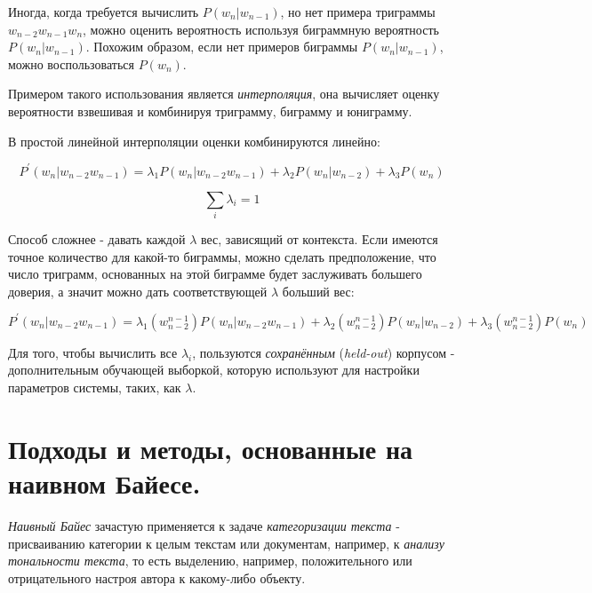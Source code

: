 \documentclass[a4paper,12pt,preview]{report} %
\begin{document}
	 Иногда, когда требуется вычислить $P(w_n | w_{n-1})$, но нет примера триграммы $w_{n-2}w_{n-1}w_{n}$, можно оценить вероятность используя биграммную вероятность $P(w_{n} | w_{n-1})$. Похожим образом, если нет примеров биграммы $P(w_n | w_{n-1})$, можно воспользоваться $P(w_n)$.
	 
	 Примером такого использования является \textit{интерполяция}, она вычисляет оценку вероятности взвешивая и комбинируя триграмму, биграмму и юниграмму.
	 
	 В простой линейной интерполяции оценки комбинируются линейно:
	 
	 \begin{equation}
	 	P^{'}(w_n | w_{n-2} w_{n-1}) = \lambda_1 P(w_n | w_{n-2} w_{n-1}) + \lambda_2 P(w_n | w_{n-2}) + \lambda_3 P(w_n)
	 \end{equation}
	 
	 
	 \begin{equation}
	 	\sum_i \lambda_i = 1
	 \end{equation}
	 
	 Способ сложнее - давать каждой $\lambda$ вес, зависящий от контекста. Если имеются точное количество для какой-то биграммы, можно сделать предположение, что число триграмм, основанных на этой биграмме будет заслуживать большего доверия, а значит можно дать соответствующей $\lambda$ больший вес:
	 
	 \begin{equation}
	 	P^{'}(w_n | w_{n-2} w_{n-1}) = \lambda_1 (w_{n-2}^{n-1}) P(w_n | w_{n-2} w_{n-1}) + \lambda_2 (w_{n-2}^{n-1}) P(w_n | w_{n-2}) + \lambda_3 (w_{n-2}^{n-1}) P(w_n)
	 \end{equation}
	 
	  Для того, чтобы вычислить все $\lambda_i$, пользуются \textit{сохранённым} (\textit{held-out}) корпусом - дополнительным обучающей выборкой, которую используют для настройки параметров системы, таких, как $\lambda$. 
	
	\section{Подходы и методы, основанные на наивном Байесе.}
	
	\textit{Наивный Байес} зачастую применяется к задаче \textit{категоризации текста} - присваиванию категории к целым текстам или документам, например, к \textit{анализу тональности текста}, то есть выделению, например, положительного или отрицательного настроя автора к какому-либо объекту. \cite{14}
	
\end{document}
